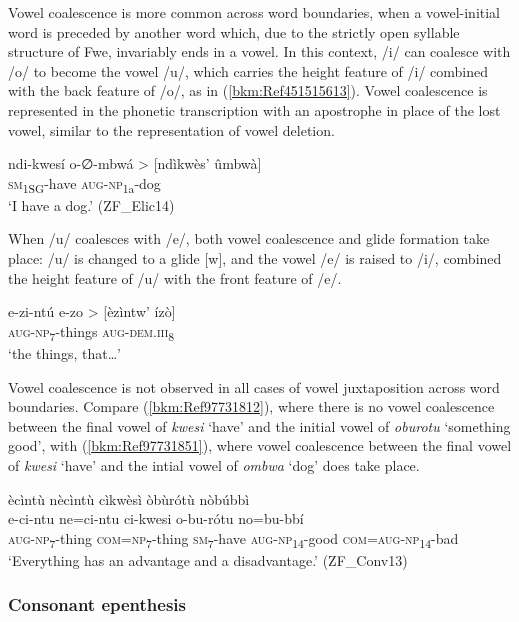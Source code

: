 Vowel coalescence is more common across word boundaries, when a vowel-initial word is pre\-ceded by another word which, due to the strictly open syllable structure of Fwe, invariably ends in a vowel. In this context, /i/ can coalesce with /o/ to become the vowel /u/, which carries the height feature of /i/ combined with the back fea\-ture of /o/, as in (\ref{bkm:Ref451515613}). Vowel coalescence is represented in the phonetic transcription with an apostrophe in place of the lost vowel, similar to the representation of vowel deletion.

\ea
\label{bkm:Ref451515613}
\label{bkm:Ref97731851}
\gll ndi-kwesí   o-∅-mbwá > [ndìkwès’ ûmbwà]\\
\textsc{sm}\textsubscript{1SG}-have  \textsc{aug}-\textsc{np}\textsubscript{1a}-dog\\
\glt ‘I have a dog.’ (ZF\_Elic14)
\z

When /u/ coalesces with /e/, both vowel coalescence and glide formation take place: /u/ is changed to a glide [w], and the vowel /e/ is raised to /i/, combined the height feature of /u/ with the front feature of /e/.

\ea
\gll e-zi-ntú     e-zo > [èzìntw’ ízò]\\
\textsc{aug}-\textsc{np}\textsubscript{7}-things  \textsc{aug}-\textsc{dem}.\textsc{iii}\textsubscript{8}\\
\glt ‘the things, that…’
\z

Vowel coalescence is not observed in all cases of vowel juxtaposition across word boundaries. Compare (\ref{bkm:Ref97731812}), where there is no vowel coalescence between the final vowel of \textit{kwesi} ‘have’ and the initial vowel of \textit{oburotu} ‘something good’, with (\ref{bkm:Ref97731851}), where vowel coalescence between the final vowel of \textit{kwesi} ‘have’ and the intial vowel of \textit{ombwa} ‘dog’ does take place.

\ea
\label{bkm:Ref97731812}
ècìntù nècìntù cìkwèsì òbùrótù nòbúbbì\\
\gll e-ci-ntu    ne=ci-ntu    ci-kwesi  o-bu-rótu no=bu-bbí   \\
\textsc{aug}-\textsc{np}\textsubscript{7}-thing  \textsc{com}=\textsc{np}\textsubscript{7}-thing  \textsc{sm}\textsubscript{7}-have  \textsc{aug}-\textsc{np}\textsubscript{14}-good \textsc{com}=\textsc{aug}-\textsc{np}\textsubscript{14}-bad\\
\glt ‘Everything has an advantage and a disadvantage.’ (ZF\_Conv13)
\z
\subsubsection{Consonant epenthesis}

